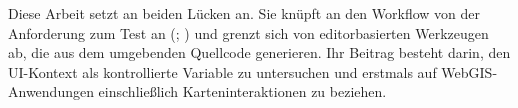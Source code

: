 Diese Arbeit setzt an beiden Lücken an. Sie knüpft an den Workflow von der Anforderung zum Test an (\cite{plein_automatic_2023}; \cite{ferreira_acceptance_2025}) und grenzt sich von editorbasierten Werkzeugen ab, die aus dem umgebenden Quellcode generieren. Ihr Beitrag besteht darin, den \ac{UI}-Kontext als kontrollierte Variable zu untersuchen und erstmals auf WebGIS-Anwendungen einschließlich Karteninteraktionen zu beziehen.